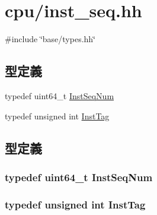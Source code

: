 \hypertarget{inst__seq_8hh}{
\section{cpu/inst\_\-seq.hh}
\label{inst__seq_8hh}
}
{\ttfamily \#include \char`\"{}base/types.hh\char`\"{}}\par
\subsection*{型定義}
\begin{DoxyCompactItemize}
\item 
typedef uint64\_\-t \hyperlink{inst__seq_8hh_a258d93d98edaedee089435c19ea2ea2e}{InstSeqNum}
\item 
typedef unsigned int \hyperlink{inst__seq_8hh_a3a5da5de6375582a82c3997c9faa7d7d}{InstTag}
\end{DoxyCompactItemize}


\subsection{型定義}
\hypertarget{inst__seq_8hh_a258d93d98edaedee089435c19ea2ea2e}{
\subsubsection[{InstSeqNum}]{\setlength{\rightskip}{0pt plus 5cm}typedef uint64\_\-t {\bf InstSeqNum}}}
\label{inst__seq_8hh_a258d93d98edaedee089435c19ea2ea2e}
\hypertarget{inst__seq_8hh_a3a5da5de6375582a82c3997c9faa7d7d}{
\subsubsection[{InstTag}]{\setlength{\rightskip}{0pt plus 5cm}typedef unsigned int {\bf InstTag}}}
\label{inst__seq_8hh_a3a5da5de6375582a82c3997c9faa7d7d}
